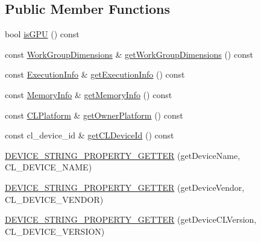 \subsection*{Public Member Functions}
\begin{DoxyCompactItemize}
\item 
bool \hyperlink{class_c_l_ray_tracer_1_1_open_c_l_utils_1_1_c_l_device_aeb49ed8a4b05a963fae850ba2c3983c2}{is\+G\+PU} () const 
\item 
const \hyperlink{class_c_l_ray_tracer_1_1_open_c_l_utils_1_1_c_l_device_1_1_work_group_dimensions}{Work\+Group\+Dimensions} \& \hyperlink{class_c_l_ray_tracer_1_1_open_c_l_utils_1_1_c_l_device_a9165ffcc56fe1202a3e9ed5ba0efe6ae}{get\+Work\+Group\+Dimensions} () const 
\item 
const \hyperlink{class_c_l_ray_tracer_1_1_open_c_l_utils_1_1_c_l_device_1_1_execution_info}{Execution\+Info} \& \hyperlink{class_c_l_ray_tracer_1_1_open_c_l_utils_1_1_c_l_device_a8e1055b82c73464ac146717eef6fe72d}{get\+Execution\+Info} () const 
\item 
const \hyperlink{class_c_l_ray_tracer_1_1_open_c_l_utils_1_1_c_l_device_1_1_memory_info}{Memory\+Info} \& \hyperlink{class_c_l_ray_tracer_1_1_open_c_l_utils_1_1_c_l_device_ad39bfa2a00d667bba6294beb41cc77fa}{get\+Memory\+Info} () const 
\item 
const \hyperlink{class_c_l_ray_tracer_1_1_open_c_l_utils_1_1_c_l_platform}{C\+L\+Platform} \& \hyperlink{class_c_l_ray_tracer_1_1_open_c_l_utils_1_1_c_l_device_a1cd107937ec0acdd9b3fb497597e1bca}{get\+Owner\+Platform} () const 
\item 
const cl\+\_\+device\+\_\+id \& \hyperlink{class_c_l_ray_tracer_1_1_open_c_l_utils_1_1_c_l_device_ae5c42514e53efb78c52bba80847d05bc}{get\+C\+L\+Device\+Id} () const 
\item 
\hyperlink{class_c_l_ray_tracer_1_1_open_c_l_utils_1_1_c_l_device_a18c1cc0cd87f53c41bbbeee5fb53912b}{D\+E\+V\+I\+C\+E\+\_\+\+S\+T\+R\+I\+N\+G\+\_\+\+P\+R\+O\+P\+E\+R\+T\+Y\+\_\+\+G\+E\+T\+T\+ER} (get\+Device\+Name, C\+L\+\_\+\+D\+E\+V\+I\+C\+E\+\_\+\+N\+A\+ME)
\item 
\hyperlink{class_c_l_ray_tracer_1_1_open_c_l_utils_1_1_c_l_device_afbd6d1360d032773b6eb3d1dfad881fd}{D\+E\+V\+I\+C\+E\+\_\+\+S\+T\+R\+I\+N\+G\+\_\+\+P\+R\+O\+P\+E\+R\+T\+Y\+\_\+\+G\+E\+T\+T\+ER} (get\+Device\+Vendor, C\+L\+\_\+\+D\+E\+V\+I\+C\+E\+\_\+\+V\+E\+N\+D\+OR)
\item 
\hyperlink{class_c_l_ray_tracer_1_1_open_c_l_utils_1_1_c_l_device_a5abcf8463c94670c32f49e77c1b19022}{D\+E\+V\+I\+C\+E\+\_\+\+S\+T\+R\+I\+N\+G\+\_\+\+P\+R\+O\+P\+E\+R\+T\+Y\+\_\+\+G\+E\+T\+T\+ER} (get\+Device\+C\+L\+Version, C\+L\+\_\+\+D\+E\+V\+I\+C\+E\+\_\+\+V\+E\+R\+S\+I\+ON)

\end{DoxyCompactItemize}
